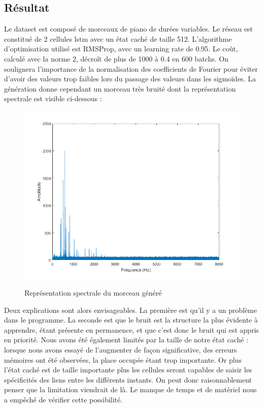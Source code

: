 \subsection{Résultat}

Le dataset est composé de morceaux de piano de durées variables. Le réseau est constitué de 2 cellules lstm avec un état caché de taille 512. L'algorithme d'optimisation utilisé est RMSProp, avec un learning rate de 0.95. Le coût, calculé avec la norme 2, décroît de plus de 1000 à 0.4 en 600 batchs. On soulignera l'importance de la normalisation des coefficients de Fourier pour éviter d'avoir des valeurs trop faibles lors du passage des valeurs dans les sigmoïdes.
La génération donne cependant un morceau très bruité dont la représentation spectrale est visible ci-dessous :

\begin{figure}[!h]
\begin{center}
	{\includegraphics[scale=0.4]{images/chapter9/spectre.png}\label{spectre}}
  \caption{Représentation spectrale du morceau généré}
\end{center}
\end{figure}

Deux explications sont alors envisageables. La première est qu'il y a un problème dans le programme. La seconde est que le bruit est la structure la plus évidente à apprendre, étant présente en permanence, et que c'est donc le bruit qui est appris en priorité. Nous avons été également limités par la taille de notre état caché : lorsque nous avons essayé de l'augmenter de façon significative, des erreurs mémoires ont été observées, la place occupée étant trop importante. Or plus l'état caché est de taille importante plus les cellules seront capables de saisir les spécificités des liens entre les différents instants. On peut donc raisonnablement penser que la limitation viendrait de là. Le manque de temps et de matériel nous a empêché de vérifier cette possibilité.


